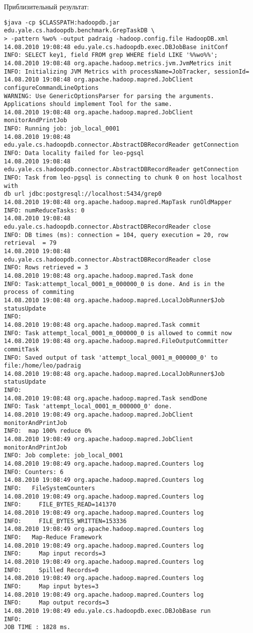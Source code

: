 Приблизительный результат:
\begin{lstlisting}[label=lst:haddop25,caption=Тестирование]
$java -cp $CLASSPATH:hadoopdb.jar edu.yale.cs.hadoopdb.benchmark.GrepTaskDB \
> -pattern %wo% -output padraig -hadoop.config.file HadoopDB.xml
14.08.2010 19:08:48 edu.yale.cs.hadoopdb.exec.DBJobBase initConf
INFO: SELECT key1, field FROM grep WHERE field LIKE '%%wo%%';
14.08.2010 19:08:48 org.apache.hadoop.metrics.jvm.JvmMetrics init
INFO: Initializing JVM Metrics with processName=JobTracker, sessionId=
14.08.2010 19:08:48 org.apache.hadoop.mapred.JobClient configureCommandLineOptions
WARNING: Use GenericOptionsParser for parsing the arguments.
Applications should implement Tool for the same.
14.08.2010 19:08:48 org.apache.hadoop.mapred.JobClient monitorAndPrintJob
INFO: Running job: job_local_0001
14.08.2010 19:08:48 edu.yale.cs.hadoopdb.connector.AbstractDBRecordReader getConnection
INFO: Data locality failed for leo-pgsql
14.08.2010 19:08:48 edu.yale.cs.hadoopdb.connector.AbstractDBRecordReader getConnection
INFO: Task from leo-pgsql is connecting to chunk 0 on host localhost with
db url jdbc:postgresql://localhost:5434/grep0
14.08.2010 19:08:48 org.apache.hadoop.mapred.MapTask runOldMapper
INFO: numReduceTasks: 0
14.08.2010 19:08:48 edu.yale.cs.hadoopdb.connector.AbstractDBRecordReader close
INFO: DB times (ms): connection = 104, query execution = 20, row retrieval  = 79
14.08.2010 19:08:48 edu.yale.cs.hadoopdb.connector.AbstractDBRecordReader close
INFO: Rows retrieved = 3
14.08.2010 19:08:48 org.apache.hadoop.mapred.Task done
INFO: Task:attempt_local_0001_m_000000_0 is done. And is in the process of commiting
14.08.2010 19:08:48 org.apache.hadoop.mapred.LocalJobRunner$Job statusUpdate
INFO:
14.08.2010 19:08:48 org.apache.hadoop.mapred.Task commit
INFO: Task attempt_local_0001_m_000000_0 is allowed to commit now
14.08.2010 19:08:48 org.apache.hadoop.mapred.FileOutputCommitter commitTask
INFO: Saved output of task 'attempt_local_0001_m_000000_0' to file:/home/leo/padraig
14.08.2010 19:08:48 org.apache.hadoop.mapred.LocalJobRunner$Job statusUpdate
INFO:
14.08.2010 19:08:48 org.apache.hadoop.mapred.Task sendDone
INFO: Task 'attempt_local_0001_m_000000_0' done.
14.08.2010 19:08:49 org.apache.hadoop.mapred.JobClient monitorAndPrintJob
INFO:  map 100% reduce 0%
14.08.2010 19:08:49 org.apache.hadoop.mapred.JobClient monitorAndPrintJob
INFO: Job complete: job_local_0001
14.08.2010 19:08:49 org.apache.hadoop.mapred.Counters log
INFO: Counters: 6
14.08.2010 19:08:49 org.apache.hadoop.mapred.Counters log
INFO:   FileSystemCounters
14.08.2010 19:08:49 org.apache.hadoop.mapred.Counters log
INFO:     FILE_BYTES_READ=141370
14.08.2010 19:08:49 org.apache.hadoop.mapred.Counters log
INFO:     FILE_BYTES_WRITTEN=153336
14.08.2010 19:08:49 org.apache.hadoop.mapred.Counters log
INFO:   Map-Reduce Framework
14.08.2010 19:08:49 org.apache.hadoop.mapred.Counters log
INFO:     Map input records=3
14.08.2010 19:08:49 org.apache.hadoop.mapred.Counters log
INFO:     Spilled Records=0
14.08.2010 19:08:49 org.apache.hadoop.mapred.Counters log
INFO:     Map input bytes=3
14.08.2010 19:08:49 org.apache.hadoop.mapred.Counters log
INFO:     Map output records=3
14.08.2010 19:08:49 edu.yale.cs.hadoopdb.exec.DBJobBase run
INFO:
JOB TIME : 1828 ms.


\end{lstlisting}
